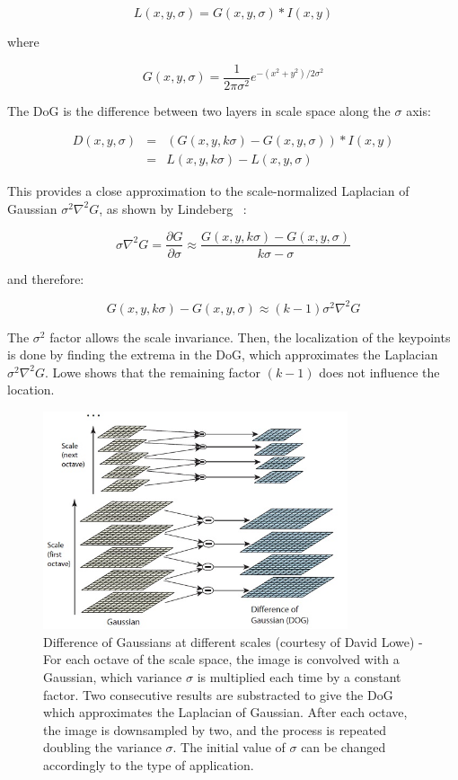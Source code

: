 \[ L(x,y,\sigma) = G(x,y,\sigma) * I(x,y) \]

where

\[ G(x,y,\sigma) = \frac{1}{2\pi\sigma^2}e^{-{(x^2+y^2)/2\sigma^2}} \]


The \gls{DoG} is the difference between two layers in scale space along the $\sigma$ axis:

\[
\begin{array}{rcl}
D(x,y,\sigma) & = & (G(x,y, k\sigma) - G(x,y,\sigma)) * I(x,y) \\
 & = & L(x,y,k\sigma) - L(x,y,\sigma)
\end{array}
\] 

This provides a close approximation to the scale-normalized Laplacian of Gaussian $\sigma^2\nabla^2G$, as shown by Lindeberg ~\cite{Lindeberg_1994}:

\[ \sigma\nabla^2G = \frac{\partial G}{\partial \sigma} \approx \frac{G(x,y,k\sigma)-G(x,y,\sigma)}{k\sigma - \sigma} \]

and therefore:

\[ G(x,y,k\sigma) - G(x,y,\sigma) \approx (k-1)\sigma^2\nabla^2G \]

The $\sigma^2$ factor allows the scale invariance. Then, the localization of the keypoints is done by finding the extrema in the \gls{DoG}, which approximates the Laplacian $\sigma^2\nabla^2G$. Lowe shows that the remaining factor $(k-1)$ does not influence the location. 

\begin{figure}[h]
\centering
\includegraphics[width=0.8\textwidth]{figures/sift_dog}
\caption{Difference of Gaussians at different scales (courtesy of David Lowe) - For each octave of the scale space, the image is convolved with a Gaussian, which variance $\sigma$ is multiplied each time by a constant factor. Two consecutive results are substracted to give the DoG which approximates the Laplacian of Gaussian. After each octave, the image is downsampled by two, and the process is repeated doubling the variance $\sigma$. The initial value of $\sigma$ can be changed accordingly to the type of application. }
\label{fig:sift_dog}
\end{figure}

